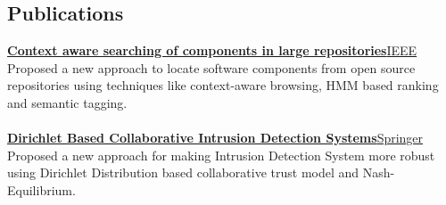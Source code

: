 \documentclass[margin,line]{resume}
\begin{document}
\begin{resume}
\section{\mysidestyle \bf Publications}
 {\bf\href{http://ieeexplore.ieee.org/document/7148513/?arnumber=7148513}{Context aware searching of components in large repositories}}\hfill \href{https://www.ieee.org/}{IEEE} \\
Proposed a new approach to locate software components from open source repositories using techniques like context-aware browsing, HMM based ranking and semantic tagging.\\\\
    {\bf\href{http://link.springer.com/chapter/10.1007/978-981-10-0251-9_32}{Dirichlet Based Collaborative Intrusion Detection Systems}}\hfill \href{https://www.springer.com}{Springer} \\
Proposed a new approach for making Intrusion Detection System more robust using Dirichlet Distribution based collaborative trust model and Nash-Equilibrium.
\pagebreak

\end{resume}
\end{document}
